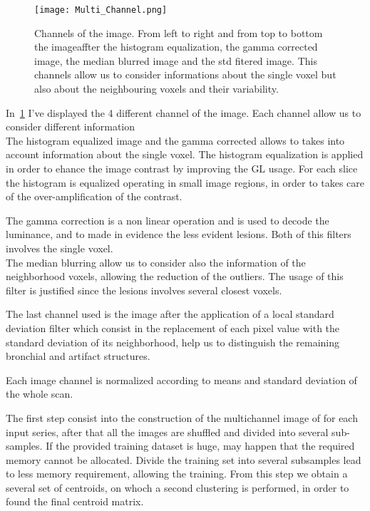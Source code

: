 		\begin{figure}[h]
			\centering
				\texttt{[image: Multi\_Channel.png]}
			\caption{Channels of the image. From left to right and from top to bottom the imageaffter the histogram equalization, the gamma corrected image, the median blurred image and the std fitered image. This channels allow us to consider informations about the single voxel but also about the neighbouring voxels and their variability. }\label{fig:MultiChannel}
		\end{figure}
	
		In \figurename\,\ref{fig:MultiChannel} I've displayed the 4 different channel of the image. Each channel allow us to consider different information\\
		The histogram equalized image and the gamma corrected allows to takes into account information about the single voxel. The histogram equalization is applied in order to ehance the image contrast by improving the GL usage. For each slice the histogram is equalized operating in small image regions, in order to takes care of the over-amplification of the contrast.
		
		 The gamma correction is a non linear operation and is used to decode the luminance, and to made in evidence the less evident lesions. Both of this filters involves the single voxel.\\The median blurring allow us to consider also the information of the neighborhood voxels, allowing the reduction of the outliers. The usage of this filter is justified since the lesions involves several closest voxels.
		 
		 The last channel used is the image after the application of a local standard deviation filter which consist in the replacement of each pixel value with the standard deviation of its neighborhood, help us to distinguish the remaining bronchial and artifact structures.
		
		Each image channel is normalized according to means and standard deviation of the whole scan.
		
		The first step consist into the construction of the multichannel image of for each input series, after that all the images are shuffled and divided into several sub-samples. If the provided training dataset is huge, may happen that the required memory cannot be allocated. Divide the training set into several subsamples lead to less memory requirement, allowing the training. From this step we obtain a several set of centroids, on whoch a second clustering is performed, in order to found the final centroid matrix.
		
